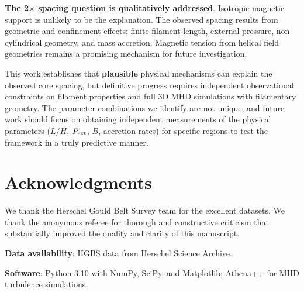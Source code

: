 \documentclass[11pt,a4paper]{article}
\begin{document}
\textbf{The 2$\times$ spacing question is qualitatively addressed}. Isotropic magnetic support is unlikely to be the explanation. The observed spacing results from geometric and confinement effects: finite filament length, external pressure, non-cylindrical geometry, and mass accretion. Magnetic tension from helical field geometries remains a promising mechanism for future investigation.

This work establishes that \textbf{plausible} physical mechanisms can explain the observed core spacing, but definitive progress requires independent observational constraints on filament properties and full 3D MHD simulations with filamentary geometry. The parameter combinations we identify are not unique, and future work should focus on obtaining independent measurements of the physical parameters ($L/H$, $P_{\rm ext}$, $B$, accretion rates) for specific regions to test the framework in a truly predictive manner.

\section*{Acknowledgments}

We thank the Herschel Gould Belt Survey team for the excellent datasets. We thank the anonymous referee for thorough and constructive criticism that substantially improved the quality and clarity of this manuscript.

\textbf{Data availability}: HGBS data from Herschel Science Archive.

\textbf{Software}: Python 3.10 with NumPy, SciPy, and Matplotlib; Athena++ \citep{Stone2020} for MHD turbulence simulations.



\end{document}
